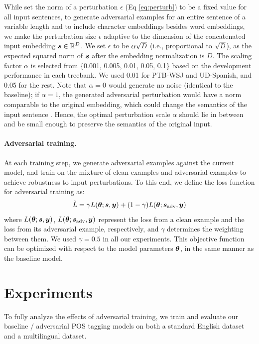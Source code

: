 \documentclass[11pt,a4paper]{article}
\newcommand{\veci}[1]{\mbox{\boldmath $#1$}}
\newcommand\scaleeq[3]{\mbox{\scalebox{#1}[#2]{$#3$}}}
\begin{document}
While  set the norm of a perturbation $\epsilon$ (Eq \ref{eq:perturb}) to be a fixed value for all input sentences,
to generate adversarial examples for an entire sentence of a variable length and to include character embeddings besides word embeddings, we make the perturbation size $\epsilon$ adaptive to the dimension of the concatenated input embedding $\veci{s} \in \mathbb{R}^D$. 
We set $\epsilon$ to be $\alpha \scaleeq{0.95}{0.95}{\sqrt{D}}$ (i.e., proportional to $\scaleeq{0.95}{0.95}{\sqrt{D}}$), as the expected squared norm of $\veci{s}$ after the embedding normalization %
is $D$.
The scaling factor $\alpha$ is selected from $\{$0.001, 0.005, 0.01, 0.05, 0.1$\}$ 
based on the development performance in each treebank. 
We used 0.01 for PTB-WSJ and UD-Spanish, and 0.05 for the rest.
Note that $\alpha \!=\! 0$ 
would generate no noise (identical to the baseline);
if $\alpha \!=\! 1$, the generated adversarial perturbation would have a norm comparable to the original embedding, which could change the semantics of the input sentence \cite{Wu2017adv}.
Hence, the optimal perturbation scale $\alpha$ should lie in between and be small enough to preserve the semantics of the original input.


\paragraph{Adversarial training.}

At each training step, we
generate adversarial examples against the current model, and train on the mixture of clean examples and adversarial examples to achieve robustness to input perturbations.
To this end, we define the loss function for adversarial training as:
$$ \tilde{L} = \gamma L(\veci{\theta}; \veci{s}, \veci{y}) + (1-\gamma) L(\veci{\theta}; \veci{s}_{\mathrm{adv}}, \veci{y})$$
where
$L(\veci{\theta}; \veci{s}, \veci{y})$, $L(\veci{\theta}; \veci{s}_{\mathrm{adv}}, \veci{y})$ represent the loss from a clean example and the loss from its adversarial example, respectively, and $\gamma $ determines the weighting between them.
We used $\gamma = 0.5$ in all our experiments.
This objective function can be optimized with respect to the model parameters $\veci{\theta}$, in the same manner as the baseline model.




\section{Experiments}
To fully analyze the effects of adversarial training,
we train and evaluate our baseline \!/\! adversarial POS tagging models on both a standard English dataset and a multilingual dataset.
\end{document}
